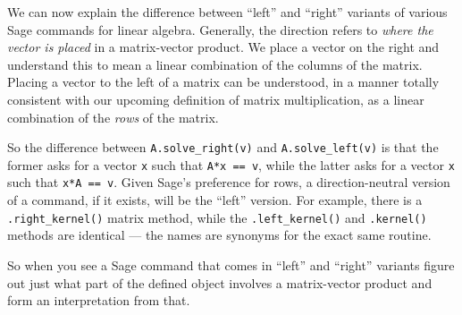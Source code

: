 %
We can now explain the difference between ``left'' and ``right'' variants of various Sage commands for linear algebra.  Generally, the direction refers to \emph{where the vector is placed} in a matrix-vector product.  We place a vector on the right and understand this to mean a linear combination of the columns of the matrix.  Placing a vector to the left of a matrix can be understood, in a manner totally consistent with our upcoming definition of matrix multiplication, as a linear combination of the \emph{rows} of the matrix.\par
%
So the difference between \verb?A.solve_right(v)? and \verb?A.solve_left(v)? is that the former asks for a vector \verb?x? such that \texttt{A*x == v}, while the latter asks for a vector \verb?x? such that \texttt{x*A == v}.  Given Sage's preference for rows, a direction-neutral version of a command, if it exists, will be the ``left'' version.  For example, there is a \verb?.right_kernel()? matrix method, while the \verb?.left_kernel()? and \verb?.kernel()? methods are identical --- the names are synonyms for the exact same routine.\par
%
So when you see a Sage command that comes in ``left'' and ``right'' variants figure out just what part of the defined object involves a matrix-vector product and form an interpretation from that.
%
\begin{sageverbatim}
\end{sageverbatim}
%

